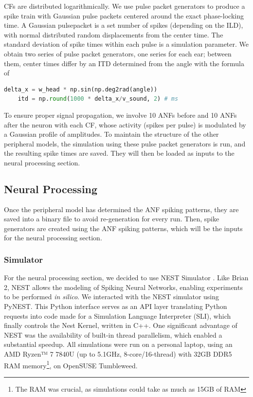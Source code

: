 \documentclass[11pt,a4paper]{article}
\begin{document}
CFs are distributed logarithmically. We use pulse packet generators to produce a spike train with Gaussian pulse packets centered around the exact phase-locking time. A Gaussian pulsepacket is a set number of spikes (depending on the ILD), with normal distributed random displacements from the center time. The standard deviation of spike times within each pulse is a simulation parameter. We obtain two series of pulse packet generators, one series for each ear; between them, center times differ by an ITD determined from the angle with the formula of 

\begin{lstlisting}[language=Python]
    delta_x = w_head * np.sin(np.deg2rad(angle))
    itd = np.round(1000 * delta_x/v_sound, 2) # ms
\end{lstlisting}
To ensure proper signal propagation, we involve 10 ANFs before and 10 ANFs after the neuron with each CF, whose activity (spikes per pulse) is modulated by a Gaussian profile of amplitudes.
To maintain the structure of the other peripheral models, the simulation using these pulse packet generators is run, and the resulting spike times are saved. They will then be loaded as inputs to the neural processing section.

\subsection{Neural Processing}
Once the peripheral model has determined the ANF spiking patterns, they are saved into a binary file to avoid re-generation for every run. Then, spike generators are created using the ANF spiking patterns, which will be the inputs for the neural processing section.

\subsubsection{Simulator}\label{met:nest}
For the neural processing section, we decided to use NEST Simulator \cite{gewaltigNESTNEuralSimulation2007}. Like Brian 2, NEST allows the modeling of Spiking Neural Networks, enabling experiments to be performed \textit{in silico}. We interacted with the NEST simulator using PyNEST. This Python interface serves as an API layer translating Python requests into code made for a Simulation Language Interpreter (SLI), which finally controls the Nest Kernel, written in C++. One significant advantage of NEST was the availability of built-in thread parallelism, which enabled a substantial speedup.
All simulations were run on a personal laptop, using an AMD Ryzen™ 7 7840U (up to 5.1GHz, 8-core/16-thread) with 32GB DDR5 RAM memory\footnote{The RAM was crucial, as simulations could take as much as 15GB of RAM}, on OpenSUSE Tumbleweed.
\end{document}
